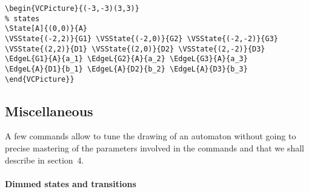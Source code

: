 \documentclass[11pt,twoside]{article}
\newlength{\parindenttemp} %
\newcommand{\noi}{\noindent}
\newlength{\jsIndent}%
\newlength{\ColSource}%
\newlength{\ColFigur}%
\begin{document}
\medskip 

\noi 
\hspace*{-\jsIndent}
\begin{minipage}[c]{\ColFigur}%
\par\vspace*{0mm}%
\begin{center}
\SmallPicture{}%
\end{center}
\end{minipage}%
\hspace*{1.2em}%
\begin{minipage}[c]{\ColSource}
\setlength{\parindent}{\parindenttemp}%
\par\vspace*{0mm}%
\footnotesize
\begin{verbatim}
\begin{VCPicture}{(-3,-3)(3,3)}
% states
\State[A]{(0,0)}{A}
\VSState{(-2,2)}{G1} \VSState{(-2,0)}{G2} \VSState{(-2,-2)}{G3}
\VSState{(2,2)}{D1} \VSState{(2,0)}{D2} \VSState{(2,-2)}{D3}
\EdgeL{G1}{A}{a_1} \EdgeL{G2}{A}{a_2} \EdgeL{G3}{A}{a_3}
\EdgeL{A}{D1}{b_1} \EdgeL{A}{D2}{b_2} \EdgeL{A}{D3}{b_3}
\end{VCPicture}}
\end{verbatim}
\normalsize
\end{minipage}%

\subsection{Miscellaneous}\label{subsec.misc1}

A few commands allow to tune the drawing of an automaton without 
going to precise mastering of the parameters involved in the commands 
and that we shall describe in section~4.

\paragraph{Dimmed states and transitions}
~
\end{document}
